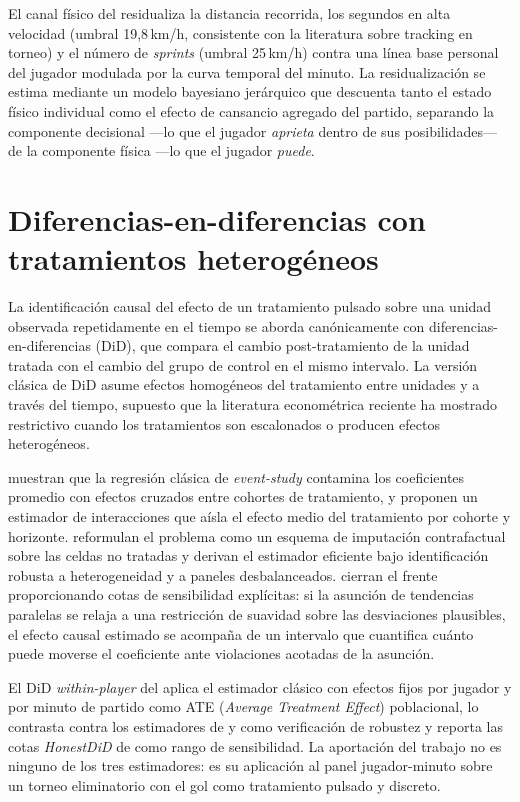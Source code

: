 El canal físico del \CCV residualiza la distancia recorrida, los
segundos en alta velocidad (umbral 19{,}8\,km/h, consistente con la
literatura sobre tracking en torneo) y el número de \textit{sprints}
(umbral 25\,km/h) contra una línea base personal del jugador modulada
por la curva temporal del minuto. La residualización se estima mediante un modelo
bayesiano jerárquico que descuenta tanto el estado físico individual
como el efecto de cansancio agregado del partido, separando la
componente decisional ---lo que el jugador \textit{aprieta} dentro de
sus posibilidades--- de la componente física ---lo que el jugador
\textit{puede}.


\section{Diferencias-en-diferencias con tratamientos heterogéneos}
\label{sec:sota-did}

La identificación causal del efecto de un tratamiento pulsado sobre
una unidad observada repetidamente en el tiempo se aborda
canónicamente con diferencias-en-diferencias (DiD), que compara el
cambio post-tratamiento de la unidad tratada con el cambio del grupo
de control en el mismo intervalo. La versión clásica de DiD asume
efectos homogéneos del tratamiento entre unidades y a través del
tiempo, supuesto que la literatura econométrica reciente ha mostrado
restrictivo cuando los tratamientos son escalonados o producen efectos
heterogéneos.

\textcite{SunAbraham2021} muestran que la regresión clásica de
\textit{event-study} contamina los coeficientes promedio con efectos
cruzados entre cohortes de tratamiento, y proponen un estimador de
interacciones que aísla el efecto medio del tratamiento por cohorte y
horizonte. \textcite{BorusyakJaravelSpiess2024} reformulan el problema
como un esquema de imputación contrafactual sobre las celdas no
tratadas y derivan el estimador eficiente bajo identificación robusta
a heterogeneidad y a paneles desbalanceados. \textcite{RambachanRoth2023}
cierran el frente proporcionando cotas de sensibilidad explícitas: si
la asunción de tendencias paralelas se relaja a una restricción de
suavidad sobre las desviaciones plausibles, el efecto causal estimado
se acompaña de un intervalo que cuantifica cuánto puede moverse el
coeficiente ante violaciones acotadas de la asunción.

El DiD \textit{within-player} del \CCV aplica el estimador clásico con
efectos fijos por jugador y por minuto de partido como ATE
(\textit{Average Treatment Effect}) poblacional,
lo contrasta contra los estimadores de \citeauthor{SunAbraham2021} y
\citeauthor{BorusyakJaravelSpiess2024} como verificación de robustez y
reporta las cotas \textit{HonestDiD} de \citeauthor{RambachanRoth2023}
como rango de sensibilidad. La aportación del trabajo no es ninguno
de los tres estimadores: es su aplicación al panel jugador-minuto
sobre un torneo eliminatorio con el gol como tratamiento pulsado y
discreto.


